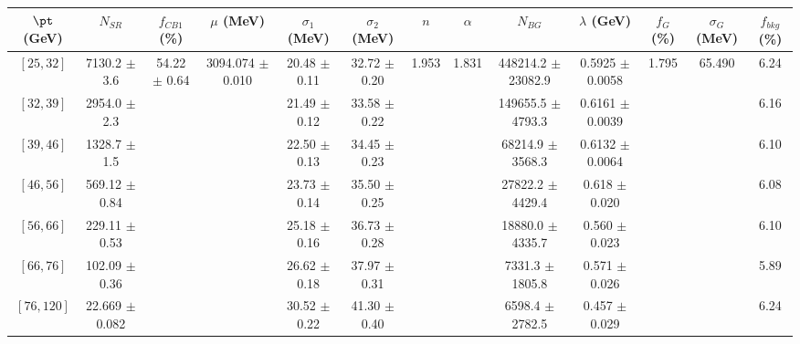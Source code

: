 \begin{tabular}{c||c|c|c|c|c|c|c|c|c|c|c||c}
$\pt$ (GeV) & $N_{SR}$ & $f_{CB1}$ (\%) & $\mu$ (MeV) & $\sigma_1$ (MeV) & $\sigma_2$ (MeV) & $n$ & $\alpha$ & $N_{BG}$ & $\lambda$ (GeV) & $f_G$ (\%) & $\sigma_G$ (MeV) & $f_{bkg}$ (\%) \\
\hline
$[25, 32]$ & 7130.2 $\pm$ 3.6 & \multirow{7}{*}{54.22 $\pm$ 0.64} & \multirow{7}{*}{3094.074 $\pm$ 0.010} & 20.48 $\pm$ 0.11 & 32.72 $\pm$ 0.20 & \multirow{7}{*}{1.953} & \multirow{7}{*}{1.831} & 448214.2 $\pm$ 23082.9 & 0.5925 $\pm$ 0.0058 & \multirow{7}{*}{1.795} & \multirow{7}{*}{65.490} & 6.24\\
$[32, 39]$ & 2954.0 $\pm$ 2.3 &  &  & 21.49 $\pm$ 0.12 & 33.58 $\pm$ 0.22 &  &  & 149655.5 $\pm$ 4793.3 & 0.6161 $\pm$ 0.0039 &  &  & 6.16\\
$[39, 46]$ & 1328.7 $\pm$ 1.5 &  &  & 22.50 $\pm$ 0.13 & 34.45 $\pm$ 0.23 &  &  & 68214.9 $\pm$ 3568.3 & 0.6132 $\pm$ 0.0064 &  &  & 6.10\\
$[46, 56]$ & 569.12 $\pm$ 0.84 &  &  & 23.73 $\pm$ 0.14 & 35.50 $\pm$ 0.25 &  &  & 27822.2 $\pm$ 4429.4 & 0.618 $\pm$ 0.020 &  &  & 6.08\\
$[56, 66]$ & 229.11 $\pm$ 0.53 &  &  & 25.18 $\pm$ 0.16 & 36.73 $\pm$ 0.28 &  &  & 18880.0 $\pm$ 4335.7 & 0.560 $\pm$ 0.023 &  &  & 6.10\\
$[66, 76]$ & 102.09 $\pm$ 0.36 &  &  & 26.62 $\pm$ 0.18 & 37.97 $\pm$ 0.31 &  &  & 7331.3 $\pm$ 1805.8 & 0.571 $\pm$ 0.026 &  &  & 5.89\\
$[76, 120]$ & 22.669 $\pm$ 0.082 &  &  & 30.52 $\pm$ 0.22 & 41.30 $\pm$ 0.40 &  &  & 6598.4 $\pm$ 2782.5 & 0.457 $\pm$ 0.029 &  &  & 6.24\\
\end{tabular}
